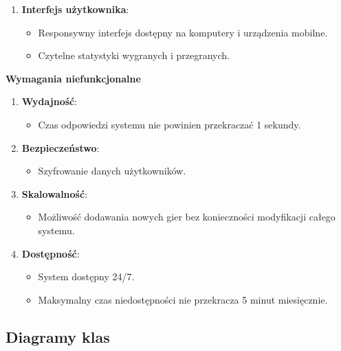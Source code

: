 \documentclass[a4paper,12pt]{article}
\begin{document}
\begin{enumerate}
  \begin{itemize}
  \item
    Możliwość blokowania kont naruszających regulamin.
  \item
    Historia transakcji i gier dostępna dla administratora.
  \end{itemize}
\item
  \textbf{Interfejs użytkownika}:

  \begin{itemize}
  \item
    Responsywny interfejs dostępny na komputery i urządzenia mobilne.
  \item
    Czytelne statystyki wygranych i przegranych.
  \end{itemize}
\end{enumerate}

\textbf{Wymagania niefunkcjonalne}

\begin{enumerate}
\def\labelenumi{\arabic{enumi}.}
\item
  \textbf{Wydajność}:
  \begin{itemize}
  \item
    Czas odpowiedzi systemu nie powinien przekraczać 1 sekundy.
  \end{itemize}
\item
  \textbf{Bezpieczeństwo}:
  \begin{itemize}
  \item
    Szyfrowanie danych użytkowników.
  \end{itemize}
\item
  \textbf{Skalowalność}:
  \begin{itemize}
  \item
    Możliwość dodawania nowych gier bez konieczności modyfikacji całego
    systemu.
  \end{itemize}
\item
  \textbf{Dostępność}:
  \begin{itemize}
  \item
    System dostępny 24/7.
  \item
    Maksymalny czas niedostępności nie przekracza 5 minut miesięcznie.
  \end{itemize}
\end{enumerate}

\subsection{Diagramy klas}
\end{document}
